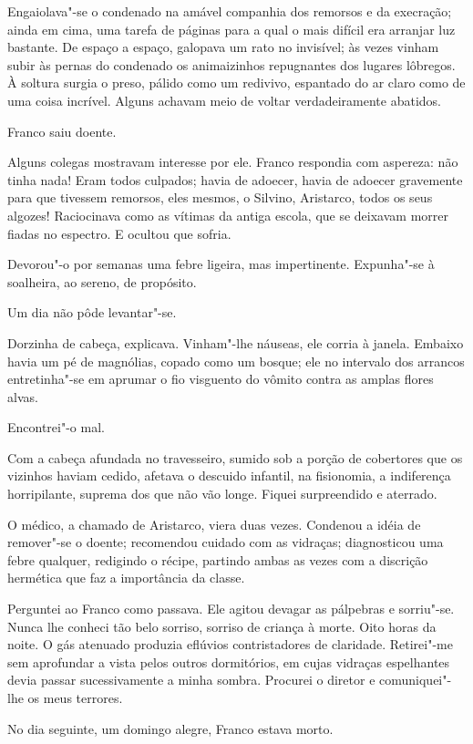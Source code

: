 Engaiolava"-se o condenado na amável companhia dos remorsos e
da execração; ainda em cima, uma tarefa de páginas para a qual o mais
difícil era arranjar luz bastante. De espaço a espaço, galopava um rato
no invisível; às vezes vinham subir às pernas do condenado os
animaizinhos repugnantes dos lugares lôbregos. À soltura surgia o
preso, pálido como um redivivo, espantado do ar claro como de uma coisa
incrível. Alguns achavam meio de voltar verdadeiramente abatidos.

Franco saiu doente. 

Alguns colegas mostravam interesse por ele. Franco
respondia com aspereza: não tinha nada! Eram todos culpados; havia de
adoecer, havia de adoecer gravemente para que tivessem remorsos, eles
mesmos, o Silvino, Aristarco, todos os seus algozes! Raciocinava como
as vítimas da antiga escola, que se deixavam morrer fiadas no espectro.
E ocultou que sofria. 

Devorou"-o por semanas uma febre ligeira, mas
impertinente. Expunha"-se à soalheira, ao sereno, de propósito. 

Um dia não pôde levantar"-se. 

Dorzinha de cabeça, explicava. Vinham"-lhe
náuseas, ele corria à janela. Embaixo havia um pé de magnólias, copado
como um bosque; ele no intervalo dos arrancos entretinha"-se em
aprumar o fio visguento do vômito contra as amplas flores alvas.

Encontrei"-o mal. 

Com a cabeça afundada no travesseiro, sumido sob a
porção de cobertores que os vizinhos haviam cedido, afetava o descuido
infantil, na fisionomia, a indiferença horripilante, suprema dos que
não vão longe. Fiquei surpreendido e aterrado. 

O médico, a chamado de
Aristarco, viera duas vezes. Condenou a idéia de remover"-se o doente;
recomendou cuidado com as vidraças; diagnosticou uma febre qualquer,
redigindo o récipe, partindo ambas as vezes com a discrição hermética
que faz a importância da classe. 

Perguntei ao Franco como passava. Ele
agitou devagar as pálpebras e sorriu"-se. Nunca lhe conheci tão belo
sorriso, sorriso de criança à morte. Oito horas da noite. O gás
atenuado produzia eflúvios contristadores de claridade. Retirei"-me
sem aprofundar a vista pelos outros dormitórios, em cujas vidraças
espelhantes devia passar sucessivamente a minha sombra. Procurei o
diretor e comuniquei"-lhe os meus terrores. 

No dia seguinte, um domingo alegre, Franco estava morto. 

